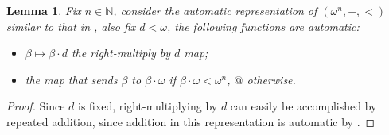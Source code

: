 \documentclass[british,a4paper,]{scrartcl}
\newtheorem{lemma}[theorem]{Lemma}
\theoremstyle{definition}
\theoremstyle{remark}
\newcommand{\N}{\mathbb{N}}
\begin{document}
\begin{lemma} \label{lemma:rightmultiply}
    Fix \(n\in\N\), consider the automatic representation of \((\omega^n, +, <)\) similar to that in , also fix \(d<\omega\), the following functions are automatic:
    \begin{itemize}
        \item \(\beta \mapsto \beta\cdot d\) the right-multiply by \(d\) map;
        \item the map that sends \(\beta\) to \(\beta\cdot\omega\) if \(\beta\cdot\omega <\omega^n\), \(@\) otherwise.
    \end{itemize}
\end{lemma}
\begin{proof}
    Since \(d\) is fixed, right-multiplying by \(d\) can easily be accomplished by repeated addition, since addition in this representation is automatic by .


\end{proof}
\end{document}
